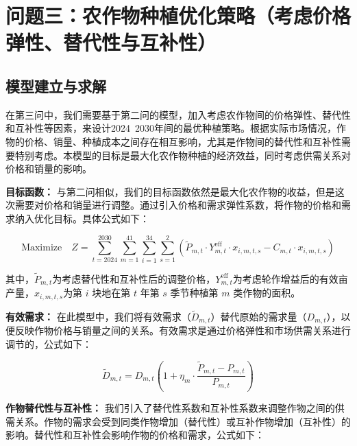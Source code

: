 \section[\hspace{-2pt}问题三：农作物种植优化策略（考虑价格弹性、替代性与互补性）]{{\heiti{} \hspace{-8pt}问题三：农作物种植优化策略（考虑价格弹性、替代性与互补性）}}\label{section3: 问题3：农作物种植优化策略}

\subsection[\hspace{-2pt}模型建立与求解]{{\heiti{} \hspace{-8pt}模型建立与求解}}\label{section3: 模型建立与求解}

在第三问中，我们需要基于第二问的模型，加入考虑农作物间的价格弹性、替代性和互补性等因素，来设计2024~2030年间的最优种植策略。根据实际市场情况，作物的价格、销量、种植成本之间存在相互影响，尤其是作物间的替代性和互补性需要特别考虑。本模型的目标是最大化农作物种植的经济效益，同时考虑供需关系对价格和销量的影响。

\textbf{目标函数：}  
与第二问相似，我们的目标函数依然是最大化农作物的收益，但是这次需要对价格和销量进行调整。通过引入价格和需求弹性系数，将作物的价格和需求纳入优化目标。具体公式如下：

\begin{equation}
  \text{Maximize}\quad Z = \sum_{t=2024}^{2030} \sum_{m=1}^{41} \sum_{i=1}^{34} \sum_{s=1}^{2} \left( \tilde{P}_{m,t} \cdot Y_{m,t}^{\text{eff}} \cdot x_{i,m,t,s} - C_{m,t} \cdot x_{i,m,t,s} \right)
\end{equation}

其中，$\tilde{P}_{m,t}$为考虑替代性和互补性后的调整价格，$Y_{m,t}^{\text{eff}}$为考虑轮作增益后的有效亩产量，$x_{i,m,t,s}$为第 $i$ 块地在第 $t$ 年第 $s$ 季节种植第 $m$ 类作物的面积。

\textbf{有效需求：}  
在此模型中，我们将有效需求（$\tilde{D}_{m,t}$）替代原始的需求量（$D_{m,t}$），以便反映作物价格与销量之间的关系。有效需求是通过价格弹性和市场供需关系进行调节的，公式如下：

\begin{equation}
  \tilde{D}_{m,t} = D_{m,t} \left( 1 + \eta_{m} \cdot \frac{\tilde{P}_{m,t} - P_{m,t}}{P_{m,t}} \right)
\end{equation}

\textbf{作物替代性与互补性：}  
我们引入了替代性系数和互补性系数来调整作物之间的供需关系。作物的需求会受到同类作物增加（替代性）或互补作物增加（互补性）的影响。替代性和互补性会影响作物的价格和需求，公式如下：

